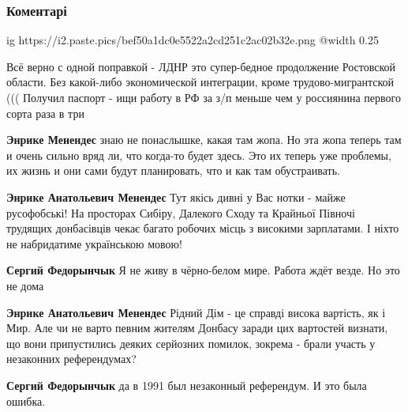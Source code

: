  
 
 
 
 
\subsubsection{Коментарі}
\label{sec:08_12_2021.fb.lesev_igor.1.strategicheskaja_pobeda_zelenskii.cmt}

\begin{itemize} %

\ifcmt
  ig https://i2.paste.pics/bef50a1dc0e5522a2cd251c2ac02b32e.png
  @width 0.25
\fi


Всё верно с одной поправкой - ЛДНР это супер-бедное продолжение Ростовской
области. Без какой-либо экономической интеграции, кроме трудово-мигрантской (((
Получил паспорт - ищи работу в РФ за з/п меньше чем у россиянина первого сорта
раза в три

\begin{itemize} %
\textbf{Энрике Менендес} знаю не понаслышке, какая там жопа. Но эта жопа теперь там и очень сильно вряд ли, что когда-то будет здесь. Это их теперь уже проблемы, их жизнь и они сами будут планировать, что и как там обустраивать.

\textbf{Энрике Анатольевич Менендес} Тут якісь дивні у Вас нотки - майже русофобські! На просторах Сибіру, Далекого Сходу та Крайньої Півночі трудящих донбасівців чекає багато робочих місць з високими зарплатами. І ніхто не набридатиме українською мовою!

\textbf{Сергий Федорынчык} Я не живу в чёрно-белом мире. Работа ждёт везде. Но это не дома

\textbf{Энрике Анатольевич Менендес} Рідний Дім - це справді висока вартість, як і Мир. Але чи не варто певним жителям Донбасу заради цих вартостей визнати, що вони припустились деяких серйозних помилок, зокрема - брали участь у незаконних референдумах?

\textbf{Сергий Федорынчык} да в 1991 был незаконный референдум. И это была ошибка.


\end{itemize}
\end{itemize}
